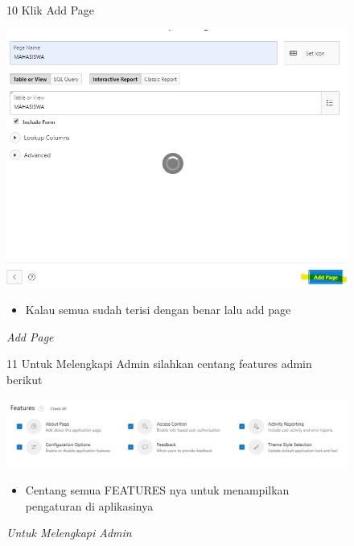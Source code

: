 \begin{itemize}
        \begin{figure}[!htbp]
        \item[10]Klik Add Page
        \begin{center}
        \includegraphics[scale=0.5]{figures/klick_add_page.jpg}
        \caption{\textit{Add Page}}
        \end{center}
       \begin{itemize}
            \item Kalau semua sudah terisi dengan benar lalu add page 
        \end{itemize}
        \end{figure}
        
        \begin{figure}[!htbp]
        \item[11]Untuk Melengkapi Admin silahkan centang features admin berikut
        \begin{center}
        \includegraphics[scale=0.4]{figures/untuk_lengkapi_admin.jpg}
        \caption{\textit{Untuk Melengkapi Admin}}
        \end{center}
        \begin{itemize}
            \item Centang semua FEATURES nya untuk menampilkan pengaturan di aplikasinya 
        \end{itemize}
        \end{figure}
        

\end{itemize}
